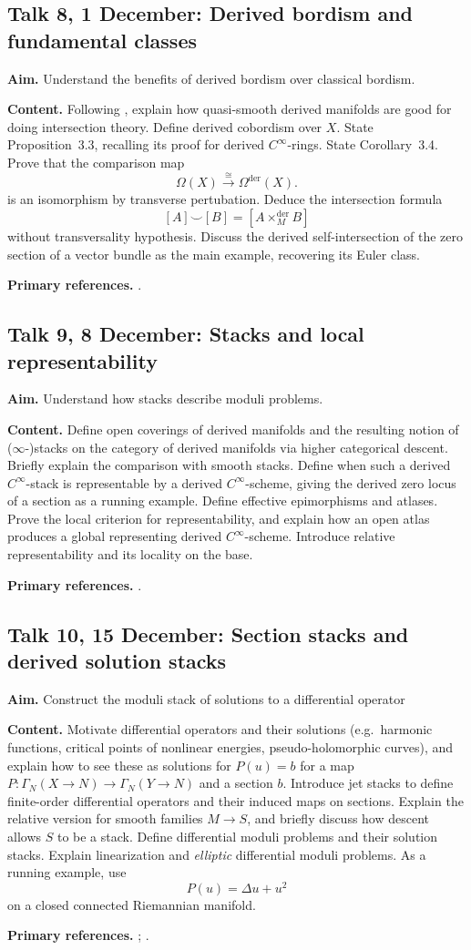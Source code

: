 \documentclass[11pt,a4paper]{article}
\newcommand{\Cinfty}{\ensuremath{C^\infty}}
\newcommand{\Talk}[6]{%
  \subsection*{Talk #1, #2: #3}
  \textbf{Aim.} #4

  \textbf{Content.} #5

  \textbf{Primary references.} #6
  \par\medskip
}
\begin{document}
\Talk{8}{1 December}{Derived bordism and fundamental classes}
{Understand the benefits of derived bordism over classical bordism.}
{Following \citet{Spivak_Derived_Smooth_Manifolds}, explain how quasi-smooth derived manifolds are good for doing intersection theory. Define derived cobordism over $X$. State Proposition~3.3, recalling its proof for derived \Cinfty-rings. State Corollary~3.4. Prove that the comparison map
	\[
	\Omega(X) \xrightarrow{\ \cong\ } \Omega^{\mathrm{der}}(X).
	\] 
	is an isomorphism by transverse pertubation. Deduce the intersection formula
	\[
	[A]\smile[B]=[A\mathbin{\times^{\mathrm{der}}_M}B]
	\]
	without transversality hypothesis. Discuss the derived self-intersection of the zero section of a vector bundle as the main example, recovering its Euler class.}
{\textcite[Sections~1--3]{Spivak_Derived_Smooth_Manifolds}.}

\Talk{9}{8 December}{Stacks and local representability}
{Understand how stacks describe moduli problems.}
{Define open coverings of derived manifolds and the resulting notion of ($\infty$-)stacks on the category of derived manifolds via higher categorical descent. Briefly explain the comparison with smooth stacks. Define when such a derived \Cinfty-stack is representable by a derived \Cinfty-scheme, giving the derived zero locus of a section as a running example. Define effective epimorphisms and atlases. Prove the local criterion for representability, and explain how an open atlas produces a global representing derived \Cinfty-scheme. Introduce relative representability and its locality on the base. }
{\textcite[Section~2.1]{Steffens_Representability_Elliptic_Moduli}.}

\Talk{10}{15 December}{Section stacks and derived solution stacks}
{Construct the moduli stack of solutions to a differential operator}
{Motivate differential operators and their solutions (e.g.\ harmonic functions, critical points of nonlinear energies, pseudo-holomorphic curves), and explain how to see these as solutions for $P(u) = b$ for a map $P\colon \Gamma_N(X \to N) \to \Gamma_N(Y \to N)$ and a section $b$. Introduce jet stacks to define finite-order differential operators and their induced maps on sections. Explain the relative version for smooth families $M\to S$, and briefly discuss how descent allows $S$ to be a stack. Define differential moduli problems and their solution stacks. Explain linearization and \emph{elliptic} differential moduli problems. As a running example, use
\[
  P(u)=\Delta u+u^2
\]
on a closed connected Riemannian manifold.}
{\textcite[Definition~3.2.1, Definition~3.3.7,
	Proposition~3.3.9, and
	Definitions~3.4.1--3.4.2]{Steffens_Representability_Elliptic_Moduli};
	\textcite[Section~4]{Pardon_Representability_Elliptic_Fredholm}.}
\end{document}
